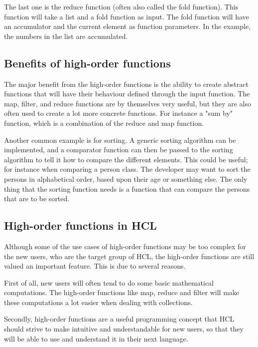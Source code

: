 The last one is the reduce function (often also called the fold function).
This function will take a list and a fold function as input. 
The fold function will have an accumulator and the current element as function parameters.
In the example, the numbers in the list are accumulated.

\subsection{Benefits of high-order functions}
The major benefit from the high-order functions is the ability to create abstract functions that will have their behaviour defined through the input function. 
The map, filter, and reduce functions are by themselves very useful, but they are also often used to create a lot more concrete functions. 
For instance a "sum by" function, which is a combination of the reduce and map function. 

Another common example is for sorting. 
A generic sorting algorithm can be implemented, and a comparator function can then be passed to the sorting algorithm to tell it how to compare the different elements.
This could be useful; for instance when comparing a person class. 
The developer may want to sort the persons in alphabetical order, based upon their age or something else. 
The only thing that the sorting function needs is a function that can compare the persons that are to be sorted.

\subsection{High-order functions in HCL}
Although some of the use cases of high-order functions may be too complex for the new users, who are the target group of HCL, the high-order functions are still valued an important feature.
This is due to several reasons.

First of all, new users will often tend to do some basic mathematical computations. 
The high-order functions like map, reduce and filter will make these computations a lot easier when dealing with collections. 

Secondly, high-order functions are a useful programming concept that HCL should strive to make intuitive and understandable for new users, so that they will be able to use and understand it in their next language.